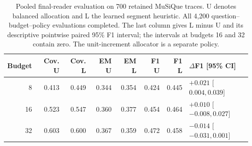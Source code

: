 \begin{table}[H]
\centering
\small
\caption{Pooled final-reader evaluation on 700 retained MuSiQue traces. U denotes balanced allocation and L the learned segment heuristic. All 4,200 question--budget--policy evaluations completed. The last column gives L minus U and its descriptive pointwise paired 95\% F1 interval; the intervals at budgets 16 and 32 contain zero. The unit-increment allocator is a separate policy.}
\label{tab:ch5-reader-fixed-traces}
\begin{tabular}{r|rr|rr|rr|l}
\hline
Budget & Cov. U & Cov. L & EM U & EM L & F1 U & F1 L & $\Delta$F1 [95\% CI] \\
\hline
8 & 0.413 & 0.449 & 0.344 & 0.354 & 0.424 & 0.445 & $+0.021$ [$ 0.004, 0.039 $] \\
16 & 0.523 & 0.547 & 0.360 & 0.377 & 0.454 & 0.464 & $+0.010$ [$ -0.008, 0.027 $] \\
32 & 0.603 & 0.600 & 0.367 & 0.359 & 0.472 & 0.458 & $-0.014$ [$ -0.031, 0.001 $] \\
\hline
\end{tabular}
\end{table}
